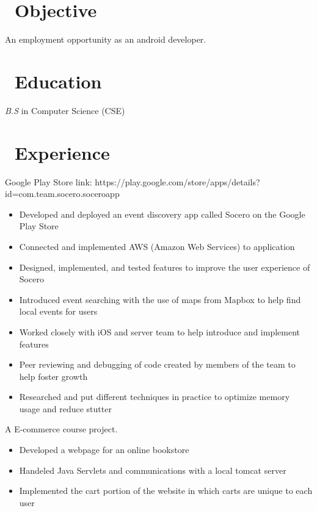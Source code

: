 \documentclass{resume}
\begin{document}



\section{\faSearch\ Objective}
An employment opportunity as an android developer.

\section{\faGraduationCap\ Education}
\textit{B.S} in Computer Science (CSE)

\section{\faUsers\ Experience}

Google Play Store link: {https://play.google.com/store/apps/details?id=com.team.socero.soceroapp}
\begin{itemize}
  \item Developed and deployed an event discovery app called Socero on the Google Play Store 
  \item Connected and implemented AWS (Amazon Web Services) to application
  \item Designed, implemented, and tested features to improve the user experience of Socero
  \item Introduced event searching with the use of maps from Mapbox to help find local events for users
  \item Worked closely with iOS and server team to help introduce and implement features
  \item Peer reviewing and debugging of code created by members of the team to help foster growth
  \item Researched and put different techniques in practice to optimize memory usage and reduce stutter
\end{itemize}

A E-commerce course project.
\begin{itemize}
  \item Developed a webpage for an online bookstore
  \item Handeled Java Servlets and communications with a local tomcat server
  \item Implemented the cart portion of the website in which carts are unique to each user
\end{itemize}
\end{document}
